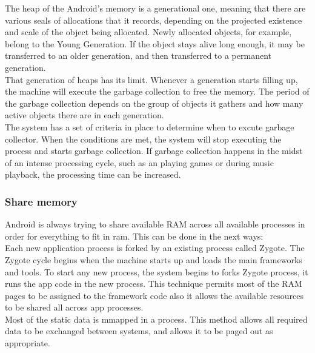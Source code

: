 \documentclass[preprint,12pt]{elsarticle}
\begin{document}
The heap of the Android's memory is a generational one, meaning that there are various seals of allocations that it records, depending on the projected existence and scale of the object being allocated. Newly allocated objects, for example, belong to the Young Generation. If the object stays alive long enough, it may be transferred to an older generation, and then transferred to a permanent generation.\\ 

That generation of heaps has its limit. Whenever a generation starts filling up, the machine will execute the garbage collection to free the memory. The period of the garbage collection depends on the group of objects it gathers and how many active objects there are in each generation.\\

The system has a set of criteria in place to determine when to excute garbage collector. When the conditions are met, the system will stop executing the process and starts garbage collection. If garbage collection happens in the midst of an intense processing cycle, such as an playing games or during music playback, the processing time can be increased.\\


\subsubsection{Share memory} 
Android is always trying to share available RAM across all available processes in order for everything to fit in ram. This can be done in the next ways:\\ 

Each new application process is forked by an existing process called Zygote. The Zygote cycle begins when the machine starts up and loads the main frameworks and tools.  To start any new process, the system begins to forks Zygote process, it runs the app code in the new process. This technique permits most of the RAM pages to be assigned to the framework code
also it allows the available resources to be shared all across  app processes. \\

Most of the static data is mmapped in a process. This method allows all required data to be exchanged between systems, and allows it to be paged out as appropriate.
\end{document}
